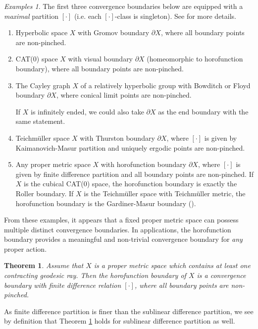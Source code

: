 \documentclass{amsart}
\newtheorem{thm}{Theorem}[section]
\theoremstyle{definition}
\theoremstyle{remark}
\newtheorem*{examples}{Examples}
\newcommand{\U}{ X}
\newcommand{\pU}{\partial{  X}}
\begin{document}
\begin{examples}\label{ConvbdryExamples}
The first three convergence boundaries below are equipped with  a \textit{maximal} partition $[\cdot]$ (i.e. each $[\cdot]$-class is singleton). See \cite{YANG22} for more details.
    \begin{enumerate}
        \item 
        Hyperbolic space $\U$ with Gromov boundary $\pU$, where  all boundary points are non-pinched.
        \item 
        CAT(0) space $\U$ with visual boundary $\pU$ (homeomorphic to horofunction boundary), where all boundary points are non-pinched.
        \item
        The Cayley graph $\U$ of a relatively hyperbolic group with Bowditch or Floyd boundary $\pU$, where  conical limit points are non-pinched.

        If $\U$ is infinitely ended, we could also take $\pU$ as the end boundary with the same statement.
        \item
        Teichm\"{u}ller space $\U$ with Thurston  boundary $\pU$, where $[\cdot]$ is given by Kaimanovich-Masur partition \cite{KaMasur} and uniquely ergodic   points are non-pinched.
        \item
        Any proper metric space $\U$ with horofunction boundary $\pU$, where $[\cdot]$ is given by finite  difference partition and all boundary points are non-pinched.
        If $\U$ is the cubical CAT(0) space, the horofunction boundary is exactly the Roller boundary. 
        If $\U$ is the Teichm\"{u}ller space with Teichm\"{u}ller metric, the horofunction boundary is  the Gardiner-Masur  boundary (\cite{LS14,Walsh19}). 
    \end{enumerate}
\end{examples}
From these examples, it appears that a fixed proper metric space can possess multiple distinct convergence boundaries. In applications, the horofunction boundary provides  a meaningful and non-trivial convergence boundary for \textit{any} proper action.
\begin{thm}\label{HorobdryConvergence}\cite[Theorem 1.1]{YANG22}
Assume that $\U$ is a proper metric space which contains at least one contracting geodesic ray. Then  the horofunction boundary of $X$ is a convergence boundary with finite difference relation $[\cdot]$, where all boundary points are non-pinched. 
\end{thm}
As finite difference partition is finer than the sublinear difference partition, we see by definition that Theorem \ref{HorobdryConvergence} holds for sublinear difference partition as well.
\end{document}
